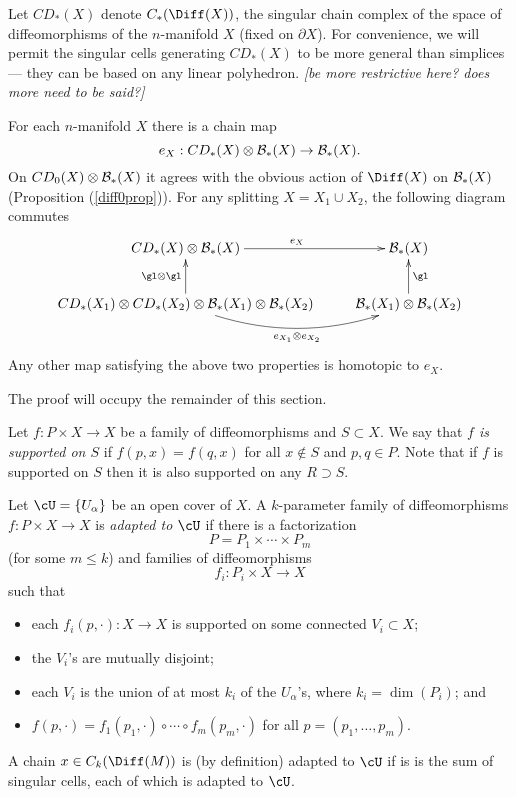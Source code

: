 \documentclass[11pt,leqno]{article}
\def\bc{{\cal B}}
\def\bd{\partial}
\def\sub{\subset}
\def\sup{\supset}
\def\nn#1{{{\it \small [#1]}}}
\newcommand{\eq}[1]{\begin{displaymath}#1\end{displaymath}}
\begin{document}
Let $CD_*(X)$ denote $C_*(\Diff(X))$, the singular chain complex of
the space of diffeomorphisms
of the $n$-manifold $X$ (fixed on $\bd X$).
For convenience, we will permit the singular cells generating $CD_*(X)$ to be more general
than simplices --- they can be based on any linear polyhedron.
\nn{be more restrictive here?  does more need to be said?}

\begin{prop}  \label{CDprop}
For each $n$-manifold $X$ there is a chain map
\eq{
	e_X : CD_*(X) \otimes \bc_*(X) \to \bc_*(X) .
}
On $CD_0(X) \otimes \bc_*(X)$ it agrees with the obvious action of $\Diff(X)$ on $\bc_*(X)$
(Proposition (\ref{diff0prop})).
For any splitting $X = X_1 \cup X_2$, the following diagram commutes
\eq{ \xymatrix{
	 CD_*(X) \otimes \bc_*(X) \ar[r]^{e_X}    & \bc_*(X) \\
	 CD_*(X_1) \otimes CD_*(X_2) \otimes \bc_*(X_1) \otimes \bc_*(X_2) 
	 	\ar@/_4ex/[r]_{e_{X_1} \otimes e_{X_2}}  \ar[u]^{\gl \otimes \gl}  & 
			\bc_*(X_1) \otimes \bc_*(X_2) \ar[u]_{\gl}
} }
Any other map satisfying the above two properties is homotopic to $e_X$.
\end{prop}

The proof will occupy the remainder of this section.

\medskip

Let $f: P \times X \to X$ be a family of diffeomorphisms and $S \sub X$.
We say that {\it $f$ is supported on $S$} if $f(p, x) = f(q, x)$ for all
$x \notin S$ and $p, q \in P$.
Note that if $f$ is supported on $S$ then it is also supported on any $R \sup S$.

Let $\cU = \{U_\alpha\}$ be an open cover of $X$.
A $k$-parameter family of diffeomorphisms $f: P \times X \to X$ is
{\it adapted to $\cU$} if there is a factorization
\eq{
	P = P_1 \times \cdots \times P_m
}
(for some $m \le k$)
and families of diffeomorphisms
\eq{
	f_i :  P_i \times X \to X
}
such that 
\begin{itemize}
\item each $f_i(p, \cdot): X \to X$ is supported on some connected $V_i \sub X$;
\item the $V_i$'s are mutually disjoint;
\item each $V_i$ is the union of at most $k_i$ of the $U_\alpha$'s, 
where $k_i = \dim(P_i)$; and
\item $f(p, \cdot) = f_1(p_1, \cdot) \circ \cdots \circ f_m(p_m, \cdot)$
for all $p = (p_1, \ldots, p_m)$.
\end{itemize}
A chain $x \in C_k(\Diff(M))$ is (by definition) adapted to $\cU$ if is is the sum
of singular cells, each of which is adapted to $\cU$.
\end{document}
